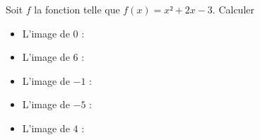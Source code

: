 \documentclass{beamer}
\begin{document}
\begin{frame}
	Soit $f$ la fonction telle que $f(x) = x² + 2x - 3$. Calculer
	\begin{itemize}
		\item L'image de $0$ :
		\item L'image de $6$ :
		\item L'image de $-1$ :
		\item L'image de $-5$ :
		\item L'image de $4$ :
	\end{itemize}
\end{frame}
\end{document}
